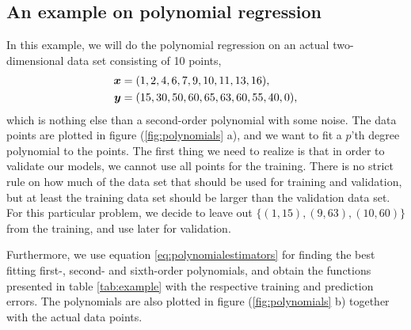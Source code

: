 \subsection{An example on polynomial regression} \label{sec:example}
In this example, we will do the polynomial regression on an actual two-dimensional data set consisting of 10 points,
\begin{equation}
\begin{aligned}
\boldsymbol{{x}}&=(1,2,4,6,7,9,10,11,13,16),\\
\boldsymbol{{y}}&=(15,30,50,60,65,63,60,55,40,0),
\label{eq:datapoints}
\end{aligned}
\end{equation}
which is nothing else than a second-order polynomial with some noise. The data points are plotted in figure (\ref{fig:polynomials} a), and we want to fit a $p$'th degree polynomial to the points. The first thing we need to realize is that in order to validate our models, we cannot use all points for the training. There is no strict rule on how much of the data set that should be used for training and validation, but at least the training data set should be larger than the validation data set. For this particular problem, we decide to leave out $\{(1,15),(9,63),(10,60)\}$ from the training, and use later for validation.

Furthermore, we use equation \eqref{eq:polynomialestimators} for finding the best fitting first-, second- and sixth-order polynomials, and obtain the functions presented in table \eqref{tab:example} with the respective training and prediction errors. The polynomials are also plotted in figure (\ref{fig:polynomials} b) together with the actual data points.

